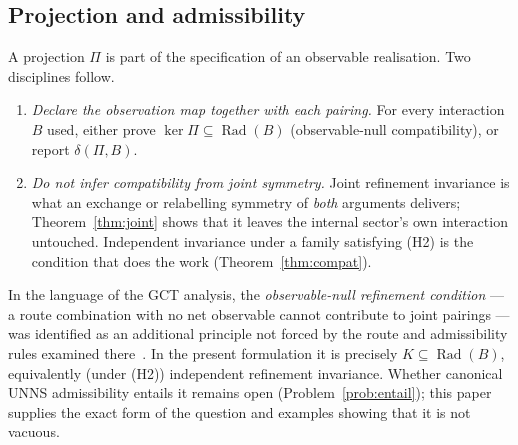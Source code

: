 \documentclass[11pt,a4paper]{article}
\newcommand{\Rad}{\operatorname{Rad}}
\newcommand{\defic}{\delta}
\theoremstyle{plain}
\theoremstyle{definition}
\begin{document}
\subsection{Projection and admissibility}
A projection $\Pi$ is part of the specification of an observable realisation. Two disciplines follow.
\begin{enumerate}[label=(D\arabic*)]
\item \emph{Declare the observation map together with each pairing.} For every interaction $B$ used, either prove $\ker\Pi\subseteq\Rad(B)$ (observable-null compatibility), or report $\defic(\Pi,B)$.
\item \emph{Do not infer compatibility from joint symmetry.} Joint refinement invariance is what an exchange or relabelling symmetry of \emph{both} arguments delivers; Theorem~\ref{thm:joint} shows that it leaves the internal sector's own interaction untouched. Independent invariance under a family satisfying (H2) is the condition that does the work (Theorem~\ref{thm:compat}).
\end{enumerate}
In the language of the GCT analysis, the \emph{observable-null refinement condition} --- a route combination with no net observable cannot contribute to joint pairings --- was identified as an additional principle not forced by the route and admissibility rules examined there~\cite{G9}. In the present formulation it is precisely $K\subseteq\Rad(B)$, equivalently (under (H2)) independent refinement invariance. Whether canonical UNNS admissibility entails it remains open (Problem~\ref{prob:entail}); this paper supplies the exact form of the question and examples showing that it is not vacuous.
\end{document}

